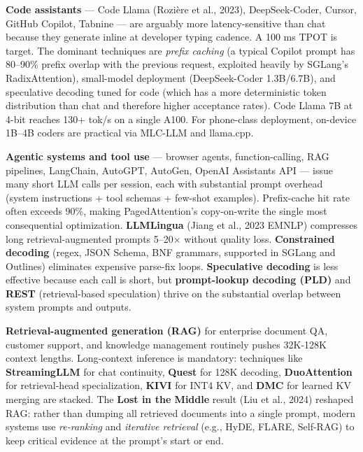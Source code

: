 \textbf{Code assistants} --- Code Llama (Rozière et al., 2023), DeepSeek-Coder, Cursor, GitHub Copilot, Tabnine --- are arguably more latency-sensitive than chat because they generate inline at developer typing cadence. A 100 ms TPOT is target. The dominant techniques are \emph{prefix caching} (a typical Copilot prompt has 80--90\% prefix overlap with the previous request, exploited heavily by SGLang's RadixAttention), small-model deployment (DeepSeek-Coder 1.3B/6.7B), and speculative decoding tuned for code (which has a more deterministic token distribution than chat and therefore higher acceptance rates). Code Llama 7B at 4-bit reaches 130+ tok/s on a single A100. For phone-class deployment, on-device 1B--4B coders are practical via MLC-LLM and llama.cpp.

\textbf{Agentic systems and tool use} --- browser agents, function-calling, RAG pipelines, LangChain, AutoGPT, AutoGen, OpenAI Assistants API --- issue many short LLM calls per session, each with substantial prompt overhead (system instructions + tool schemas + few-shot examples). Prefix-cache hit rate often exceeds 90\%, making PagedAttention's copy-on-write the single most consequential optimization. \textbf{LLMLingua} (Jiang et al., 2023 EMNLP) compresses long retrieval-augmented prompts 5--20× without quality loss. \textbf{Constrained decoding} (regex, JSON Schema, BNF grammars, supported in SGLang and Outlines) eliminates expensive parse-fix loops. \textbf{Speculative decoding} is less effective because each call is short, but \textbf{prompt-lookup decoding (PLD)} and \textbf{REST} (retrieval-based speculation) thrive on the substantial overlap between system prompts and outputs.

\textbf{Retrieval-augmented generation (RAG)} for enterprise document QA, customer support, and knowledge management routinely pushes 32K-128K context lengths. Long-context inference is mandatory: techniques like \textbf{StreamingLLM} for chat continuity, \textbf{Quest} for 128K decoding, \textbf{DuoAttention} for retrieval-head specialization, \textbf{KIVI} for INT4 KV, and \textbf{DMC} for learned KV merging are stacked. The \textbf{Lost in the Middle} result (Liu et al., 2024) reshaped RAG: rather than dumping all retrieved documents into a single prompt, modern systems use \emph{re-ranking} and \emph{iterative retrieval} (e.g., HyDE, FLARE, Self-RAG) to keep critical evidence at the prompt's start or end.

